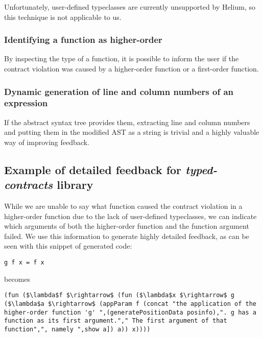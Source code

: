 \documentclass[10pt]{report}
\begin{document}
Unfortunately, user-defined typeclasses are currently unsupported by Helium, so this technique is not applicable to us.

\subsubsection{Identifying a function as higher-order}

By inspecting the type of a function, it is possible to inform the user if the contract violation was caused by a higher-order function or a first-order function.

\subsubsection{Dynamic generation of line and column numbers of an expression}

If the abstract syntax tree provides them, extracting line and column numbers and putting them in the modified AST as a string is trivial and a highly valuable way of improving feedback.

\subsection{Example of detailed feedback for \textit{typed-contracts} library}

While we are unable to say what function caused the contract violation in a higher-order function due to the lack of user-defined typeclasses, we can indicate which arguments of both the higher-order function and the function argument failed.
We use this information to generate highly detailed feedback, as can be seen with this snippet of generated code:

\begin{lstlisting}
g f x = f x
\end{lstlisting}

becomes

\begin{lstlisting}[caption=Detailed feedback is generated when applying the function argument in a higher-order function.,label=listing:detailedfeedback,mathescape]
(fun ($\lambda$f $\rightarrow$ (fun ($\lambda$x $\rightarrow$ g ($\lambda$a $\rightarrow$ (appParam f (concat "the application of the higher-order function 'g' ",(generatePositionData posinfo),". g has a function as its first argument."," The first argument of that function",", namely ",show a]) a)) x))))
\end{lstlisting}
\end{document}
